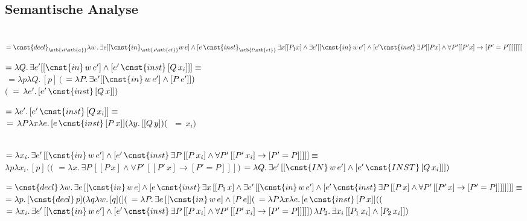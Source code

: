 \documentclass[output=paper, colorlinks, citecolor=brown, booklanguage=german]{langscibook}
\begin{document}
\begin{otherlanguage}{german}
\section{Semantische Analyse} 

\ea{}\\
$=\cnst{decl}_{\stb{st\stb{a}}}\lambda w\,.\,\exists e [[\cnst{in}_{\stb{s\stb{et}}} w\,e] \wedge [e\,\cnst{inst}_{\stb{t\stb{et}}} \,\exists x [[P_1 x] \wedge \exists e' [[\cnst{in}\,w\,e'] \wedge [e' \cnst{inst}\,\exists P [[P x] \wedge \forall P' [[P' x] \rightarrow [P' = P]]]]]]]]$
\z

\ea{} $=\lambda Q.\,\exists e' [[\cnst{in}\,w\,e'] \wedge [e'\,\cnst{inst}\,[Q\,x_{i}]]] \equiv\,$\\  $\,=\lambda p \lambda Q.\,[p]\,($ $= \lambda P.\,\exists e' [[\cnst{in}\,w\,e'] \wedge [P\,e']])$\\
$($ $\,=\,\lambda e'.\,[e'\,\cnst{inst}\,[Q\,x]])$
\z

\ea{} $= \lambda e'.\,[e'\,\cnst{inst}\,[Q\,x_i]] \equiv\,$\\  $\,=\,\lambda P \lambda x \lambda e.\,[e\,\cnst{inst}\,[P\,x]](\lambda y.\,[[Q\, y])($ $ \,=\,x_i)$
\z

\ea{}\\
$= \lambda x_{i}.\,\exists e'\,[[\cnst{in}\,w\,e'] \wedge [e'\,\cnst{inst}\,\exists P\,[[P\,x_{i}] \wedge \forall P'\,[[P'\,x_{i}] \rightarrow [P' = P]]]]] \equiv$\\ $\lambda p \lambda x_i.\,[p]\,(($ $=\lambda x.\,\exists P\,[[P\, x] \wedge \forall P'\,[[P'\,x] \rightarrow [P' = P]]])$  $=\lambda Q.\,\exists e'\,[[\cnst{IN}\,w\,e'] \wedge [e'\,\cnst{INST}\,[Q\,x_i]]])$
\z

\ea{} $=\cnst{decl}\,\lambda w.\,\exists e\,[[\cnst{in}\,w\,e] \wedge [e\,\cnst{inst}\,\exists x\,[[P_1\,x] \wedge \exists e'\,[[\cnst{in}\,w\,e'] \wedge [e'\,\cnst{inst}\,\exists P\,[[P\,x] \wedge \forall P'\,[[P'\,x] \rightarrow [P' = P]]]]]]]] \equiv$\\  $= \lambda p.\,[\cnst{decl}\,p](\lambda q \lambda w.\,[q](]($ $= \lambda P.\,\exists e\,[[\cnst{in}\,w\,e] \wedge [P\,e]]($ $= \lambda P \lambda x \lambda e.\,[e\,\cnst{inst}\,[P\,x]](($ $= \lambda x_i.\,\exists e'\,[[\cnst{in}\,w\,e'] \wedge [e'\,\cnst{inst}\,\exists P\,[[P\,x_i] \wedge \forall P'\,[[P'\,x_i] \rightarrow [P' = P]]]]])\,\lambda P_2.\,\exists x_i\,[[P_1\,x_i] \wedge [P_2\,x_i]])$


\end{otherlanguage}
\end{document}
